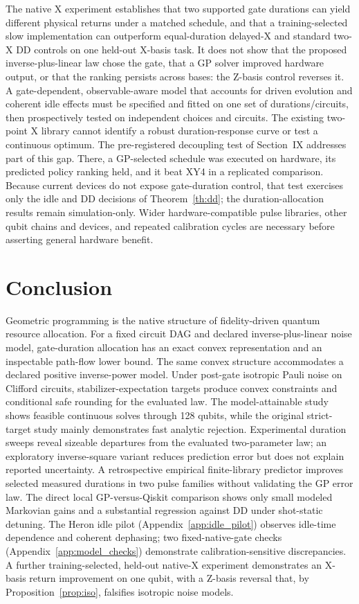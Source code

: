 \documentclass[10pt,letterpaper,journal]{IEEEtran}
\begin{document}
The native X experiment establishes that two supported gate durations can yield different physical returns under a matched schedule, and that a training-selected slow implementation can outperform equal-duration delayed-X and standard two-X DD controls on one held-out X-basis task. It does not show that the proposed inverse-plus-linear law chose the gate, that a GP solver improved hardware output, or that the ranking persists across bases: the Z-basis control reverses it. A gate-dependent, observable-aware model that accounts for driven evolution and coherent idle effects must be specified and fitted on one set of durations/circuits, then prospectively tested on independent choices and circuits. The existing two-point X library cannot identify a robust duration-response curve or test a continuous optimum. The pre-registered decoupling test of Section~IX addresses part of this gap. There, a GP-selected schedule was executed on hardware, its predicted policy ranking held, and it beat XY4 in a replicated comparison. Because current devices do not expose gate-duration control, that test exercises only the idle and DD decisions of Theorem~\ref{th:dd}; the duration-allocation results remain simulation-only. Wider hardware-compatible pulse libraries, other qubit chains and devices, and repeated calibration cycles are necessary before asserting general hardware benefit.

\section{Conclusion}
Geometric programming is the native structure of fidelity-driven quantum resource allocation. For a fixed circuit DAG and declared inverse-plus-linear noise model, gate-duration allocation has an exact convex representation and an inspectable path-flow lower bound. The same convex structure accommodates a declared positive inverse-power model. Under post-gate isotropic Pauli noise on Clifford circuits, stabilizer-expectation targets produce convex constraints and conditional safe rounding for the evaluated law. The model-attainable study shows feasible continuous solves through 128 qubits, while the original strict-target study mainly demonstrates fast analytic rejection. Experimental duration sweeps reveal sizeable departures from the evaluated two-parameter law; an exploratory inverse-square variant reduces prediction error but does not explain reported uncertainty. A retrospective empirical finite-library predictor improves selected measured durations in two pulse families without validating the GP error law. The direct local GP-versus-Qiskit comparison shows only small modeled Markovian gains and a substantial regression against DD under shot-static detuning. The Heron idle pilot (Appendix~\ref{app:idle_pilot}) observes idle-time dependence and coherent dephasing; two fixed-native-gate checks (Appendix~\ref{app:model_checks}) demonstrate calibration-sensitive discrepancies. A further training-selected, held-out native-X experiment demonstrates an X-basis return improvement on one qubit, with a Z-basis reversal that, by Proposition~\ref{prop:iso}, falsifies isotropic noise models.
\end{document}
